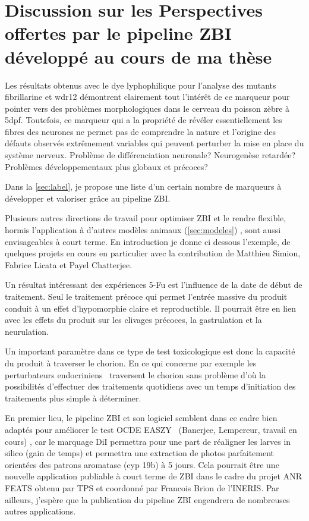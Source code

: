 \documentclass[\main/main.tex]{subfiles}
\begin{document}
\section{Discussion sur les Perspectives offertes par le pipeline ZBI développé au cours de ma thèse}
   
%
Les résultats obtenus avec le dye lyphophilique pour l'analyse des mutants fibrillarine et wdr12 démontrent clairement tout l'intérêt de ce marqueur pour pointer vers des problèmes morphologiques dans le cerveau du poisson zèbre à 5dpf.
%
Toutefois, ce marqueur qui a la propriété de révéler essentiellement les fibres des neurones ne permet pas de comprendre la nature et l'origine des défauts observés extrêmement variables qui peuvent perturber la mise en place du système nerveux.
%
Problème de différenciation neuronale? Neurogenèse retardée? Problèmes développementaux plus globaux et précoces? 

%
Dans la \autoref{sec:label}, je propose une liste d'un certain nombre de marqueurs à développer et valoriser grâce au pipeline ZBI.

%
Plusieurs autres directions de travail pour optimiser ZBI et le rendre flexible, hormis l'application à d'autres modèles animaux (\autoref{sec:modeles}) , sont aussi envisageables à court terme. En introduction je donne ci dessous l'exemple, de quelques projets en cours en particulier avec la contribution de Matthieu Simion, Fabrice Licata et Payel Chatterjee. 

%
Un résultat intéressant des expériences 5-Fu est l'influence de la date de début de traitement.
%
Seul le traitement précoce qui permet l'entrée massive du produit conduit à un effet d'hypomorphie claire et reproductible. Il pourrait être en lien avec les  effets du produit sur les clivages précoces, la gastrulation et la neurulation.

%
Un important paramètre dans ce type de test toxicologique  est donc la capacité du produit à traverser le chorion. En ce qui concerne par exemple les perturbateurs endocriniens~\cite{brion_2012} traversent le chorion sans problème d'où la possibilités d'effectuer des traitements quotidiens avec un temps d'initiation des traitements  plus simple à déterminer.

En premier lieu, le pipeline ZBI et son logiciel semblent dans ce cadre  bien  adaptés pour améliorer le test OCDE EASZY~\cite{brion_2019} (Banerjee, Lempereur, travail en cours) , car le marquage DiI permettra pour une part de réaligner les larves in silico (gain de temps) et permettra une extraction de photos parfaitement orientées des patrons aromatase (cyp 19b) à 5 jours. Cela pourrait être une nouvelle application publiable à court terme de ZBI dans le cadre du projet ANR FEATS obtenu par TPS et coordonné par Francois Brion de l'INERIS. Par ailleurs, j'espère que la publication du pipeline ZBI engendrera de nombreuses autres applications.
\end{document}
